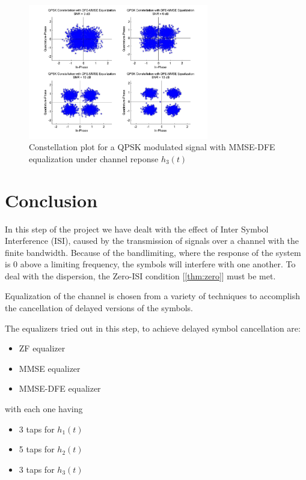 \documentclass[]{article}
\begin{document}
\begin{figure}[H]
\centering
\includegraphics[width=0.7\textwidth]{qpConstDFEMMSE3.jpg}
\caption{Constellation plot for a QPSK modulated signal with MMSE-DFE equalization under channel reponse $h_3(t)$}
\end{figure}


\newpage
\section{Conclusion}
\label{sec:conc}

In this step of the project we have dealt with the effect of Inter Symbol Interference (ISI), caused by the transmission of signals over a channel with the finite bandwidth. Because of the bandlimiting, where the response of the system is 0 above a limiting frequency, the symbols will interfere with one another. To deal with the dispersion, the Zero-ISI condition [\ref{thm:zero}] must be met. 

Equalization of the channel is chosen from a variety of techniques to accomplish the cancellation of delayed versions of the symbols. 

The equalizers tried out in this step, to achieve delayed symbol cancellation are:

\begin{itemize}
\item ZF equalizer
\item MMSE equalizer
\item MMSE-DFE equalizer
\end{itemize}

with each one having
	\begin{itemize}
	\item 3 taps for $h_1(t)$
	\item 5 taps for $h_2(t)$
	\item 3 taps for $h_3(t)$
	\end{itemize}
\end{document}
